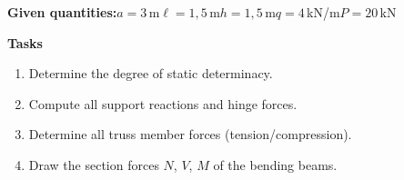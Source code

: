 \documentclass[a4paper,11pt]{article}
\begin{document}
\textbf{Given quantities:}\quad $a=3$\,m\quad $\ell=1,5$\,m\quad $h=1,5$\,m\quad $q=4$\,kN/m\quad $P=20$\,kN
\par\medskip
\textbf{Tasks}\par
\begin{enumerate}[label=\textbf{\arabic*.}]
  \item Determine the degree of static determinacy.
  \item Compute all support reactions and hinge forces.
  \item Determine all truss member forces (tension/compression).
  \item Draw the section forces $N$, $V$, $M$ of the bending beams.
\end{enumerate}
\end{document}
